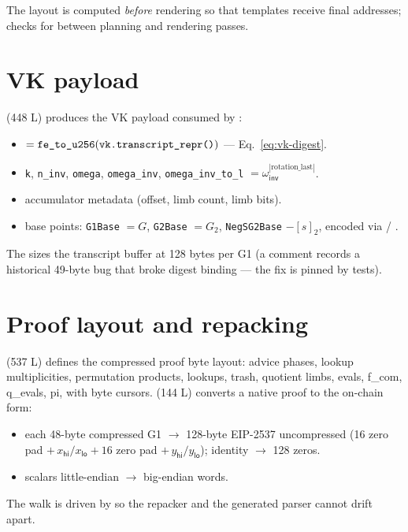The layout is computed \emph{before} rendering so that templates receive
final addresses;  checks for 
between planning and rendering passes.

\section{VK payload}
\label{sec:vkpayload}

 (448 L) produces the VK payload
consumed by :
\begin{itemize}[leftmargin=1.4em,itemsep=1pt]
  \item {} $= \texttt{fe\_to\_u256}(\texttt{vk.transcript\_\allowbreak{}repr()})$
        --- Eq.~\eqref{eq:vk-digest}.
  \item \texttt{k}, \texttt{n\_inv}, \texttt{omega}, \texttt{omega\_inv},
        \texttt{omega\_inv\_to\_l} $= \omega_{\mathsf{inv}}^{|\text{rotation\_last}|}$.
  \item accumulator metadata (offset, limb count, limb bits).
  \item base points: \texttt{G1Base} $=G$, \texttt{G2Base} $=G_2$,
        \texttt{NegSG2Base} $-[s]_2$, encoded via /
        .
\end{itemize}
The  sizes the transcript buffer at 128 bytes
per G1 (a comment records a historical 49-byte bug that broke digest
binding --- the fix is pinned by tests).

\section{Proof layout and repacking}
\label{sec:prooflayout}

 (537 L) defines the
compressed proof byte layout: advice phases, lookup multiplicities,
permutation products, lookups, trash, quotient limbs, evals, f\_com,
q\_evals, pi, with byte cursors. 
(144 L) converts a native proof to the on-chain form:
\begin{itemize}[leftmargin=1.4em,itemsep=1pt]
  \item each 48-byte compressed G1 $\rightarrow$ 128-byte EIP-2537
        uncompressed (16 zero pad $+\, x_{\mathsf{hi}}/x_{\mathsf{lo}} + 16$
        zero pad $+\, y_{\mathsf{hi}}/y_{\mathsf{lo}}$); identity $\rightarrow$
        128 zeros.
  \item scalars little-endian $\rightarrow$ big-endian words.
\end{itemize}
The walk is driven by  so the repacker and the
generated parser cannot drift apart.

